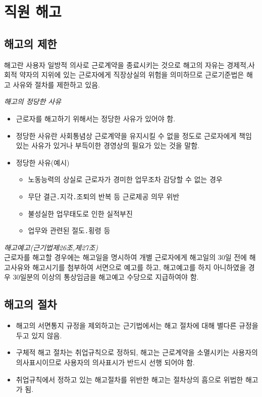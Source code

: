﻿\section{직원 해고} 
\subsection{해고의 제한}
\begin{mdframed}[linecolor=blue,middlelinewidth=2]
해고란 사용자 일방적 의사로 근로계약을 종료시키는 것으로 해고의 자유는 경제적,사회적  약자의 지위에 있는 근로자에게 직장상실의 위험을 의미하므로 근로기준법은 해고 사유와  절차를 제한하고 있음.
\end{mdframed}
\emph{해고의 정당한 사유}
\begin{itemize}[□]\tightlist 
\item 근로자를 해고하기 위해서는 정당한 사유가 있어야 함.
\item 정당한 사유란 사회통념상 근로계약을 유지시킬 수 없을 정도로 근로자에게 책임 있는 사유가 있거나 부득이한 경영상의 필요가  있는 것을 말함.
\item 정당한 사유(예시)
	\begin{itemize}[-]\tightlist 
	\item  노동능력의 상실로 근로자가 경미한 업무조차 감당할 수 없는  경우
	\item  무단 결근․지각․조퇴의 반복 등 근로제공 의무 위반
	\item  불성실한 업무태도로 인한 실적부진
	\item  업무와 관련된 절도․횡령 등
	\end{itemize}
\end{itemize}
\begin{mdframed}[linecolor=red,middlelinewidth=2]
\emph{해고예고(근기법제26조,제27조)}\\
근로자를  해고할   경우에는  해고일을   명시하여  개별 근로자에게  해고일의  30일 전에  해고사유와 해고시기를 첨부하여 서면으로 예고를 하고, 해고예고를  하지 아니하였을 경우 30일분의 이상의 통상임금을 해고예고 수당으로 지급하여야 함.
\end{mdframed}

\subsection*{해고의 절차}
\begin{itemize}[□]\tightlist 
\item 해고의 서면통지 규정을 제외하고는 근기법에서는 해고 절차에 대해 별다른 규정을 두고 있지 않음.
\item 구체적 해고 절차는 취업규칙으로 정하되, 해고는 근로계약을 소멸시키는 사용자의 의사표시이므로 사용자의 의사표시가 반드시 선행 되어야 함. 
\item 취업규칙에서 정하고 있는 해고절차를 위반한 해고는 절차상의 흠으로 위법한 해고가 됨. 
\end{itemize}

